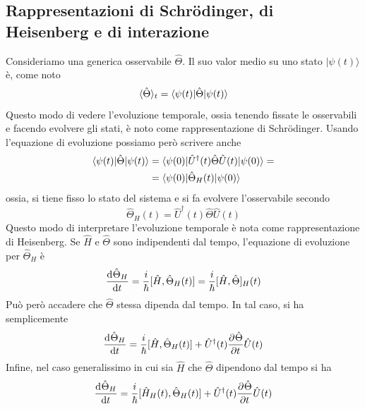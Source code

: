 \documentclass[a4paper, 11pt]{article}
\newcommand{\ham}{\hat{H}}
\renewcommand{\U}{\hat{U}}
\renewcommand{\ket}[1]{| #1\rangle}
\begin{document}
\subsection{Rappresentazioni di Schr\"odinger, di Heisenberg e di interazione}
Consideriamo una generica osservabile $\hat{\Theta}$. Il suo valor medio su uno stato $\ket{\psi(t)}$ è, come noto
\[\langle\hat{\Theta}\rangle_t=\langle\psi(t)|\hat{\Theta}|\psi(t)\rangle\]
Questo modo di vedere l'evoluzione temporale, ossia tenendo fissate le osservabili e facendo evolvere gli stati, è noto come rappresentazione di Schr\"odinger. Usando l'equazione di evoluzione possiamo però scrivere anche
\begin{align*}
	\braketop{\psi(t
		)}{\hat{\Theta}}{\psi(t)}&=\braketop{\psi(0)}{\U^\dagger(t)\hat{\Theta}\U(t)}{\psi(0)}=\\&=\braketop{\psi(0)}{\hat{\Theta}_H(t)}{\psi(0)}
\end{align*}
ossia, si tiene fisso lo stato del sistema e si fa evolvere l'osservabile secondo
\[\hat{\Theta}_H(t)=\U^\dagger(t)\hat{\Theta}\U(t)\]
Questo modo di interpretare l'evoluzione temporale è nota come rappresentazione di Heisenberg. Se $\ham$ e $\hat{\Theta}$ sono indipendenti dal tempo, l'equazione di evoluzione per $\hat{\Theta}_H$ è
\[\der{\hat{\Theta}_H}{t}=\frac{i}{\hbar}[\ham,\hat{\Theta}_H(t)]=\frac{i}{\hbar}[\ham,\hat{\Theta}]_H(t)\]
Può però accadere che $\hat{\Theta}$ stessa dipenda dal tempo. In tal caso, si ha semplicemente
\[\der{\hat{\Theta}_H}{t}=\frac{i}{\hbar}[\ham,\hat{\Theta}_H(t)]+\U^\dagger(t)\pder{\hat{\Theta}}{t}\U(t)\]
Infine, nel caso generalissimo in cui sia $\ham$ che $\hat{\Theta}$ dipendono dal tempo si ha
\[\der{\hat{\Theta}_H}{t}=\frac{i}{\hbar}[\ham_H(t),\hat{\Theta}_H(t)]+\U^\dagger(t)\pder{\hat{\Theta}}{t}\U(t)\]
\end{document}
